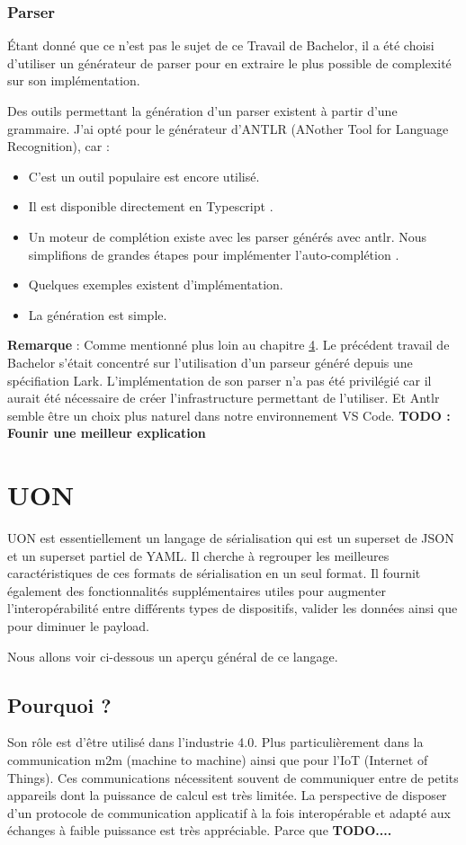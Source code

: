 \documentclass[
    iict, %
    il, %
]{heig-tb}
\begin{document}
\subsubsection{Parser}
Étant donné que ce n'est pas le sujet de ce Travail de Bachelor, il a été choisi d'utiliser un générateur de parser pour en extraire le plus possible de complexité sur son implémentation.

Des outils permettant la génération d'un parser existent à partir d'une grammaire.
J'ai opté pour le générateur d'ANTLR (ANother Tool for Language Recognition), car :

\begin{itemize}
    \item C'est un outil populaire est encore utilisé.
    \item Il est disponible directement en Typescript \cite{antlr4ts}.
    \item Un moteur de complétion existe avec les parser générés avec antlr. Nous simplifions de grandes étapes pour implémenter l'auto-complétion \cite{antlr4-c3}.
    \item Quelques exemples existent d'implémentation.
    \item La génération est simple.
\end{itemize}

\textbf{Remarque} :
Comme mentionné plus loin au chapitre \hyperref[grammar scope]{4}. Le précédent travail de Bachelor s'était concentré sur l'utilisation d'un parseur généré depuis une spécifiation Lark.
L'implémentation de son parser n'a pas été privilégié car il aurait été nécessaire de créer l'infrastructure permettant de l'utiliser.
Et Antlr semble être un choix plus naturel dans notre environnement VS Code.
\textbf{TODO : Founir une meilleur explication}

\section{UON}
UON est essentiellement un langage de sérialisation qui est un superset de JSON et un superset partiel de YAML.
Il cherche à regrouper les meilleures caractéristiques de ces formats de sérialisation en un seul format.
Il fournit également des fonctionnalités supplémentaires utiles pour augmenter l'interopérabilité entre différents types de dispositifs, valider les données ainsi que pour diminuer le payload.

Nous allons voir ci-dessous un aperçu général de ce langage.

\subsection{Pourquoi ?}
Son rôle est d'être utilisé dans l'industrie 4.0. Plus particulièrement dans la communication m2m (machine to machine) ainsi que pour l'IoT (Internet of Things).
Ces communications nécessitent souvent de communiquer entre de petits appareils dont la puissance de calcul est très limitée.
La perspective de disposer d'un protocole de communication applicatif à la fois interopérable et adapté aux échanges à faible puissance est très appréciable.
Parce que \textbf{TODO....}
\end{document}
